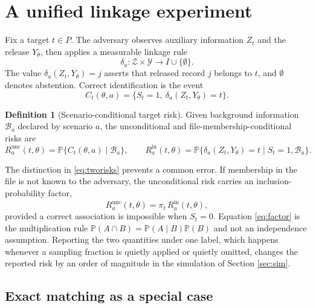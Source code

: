 \documentclass[11pt,a4paper]{article}
\theoremstyle{plain}
\theoremstyle{definition}
\newtheorem{definition}{Definition}
\theoremstyle{definition}
\theoremstyle{plain}
\newcommand{\Prob}{\mathbb{P}}
\begin{document}
\section{A unified linkage experiment}\label{sec:experiment}

Fix a target $t \in P$. The adversary observes auxiliary information $Z_t$ and
the release $Y_\theta$, then applies a measurable linkage rule
\begin{equation}
\delta_a : \mathcal{Z} \times \mathcal{Y} \longrightarrow I \cup \{\emptyset\} .
\label{eq:rule}
\end{equation}
The value $\delta_a(Z_t, Y_\theta) = j$ asserts that released record $j$
belongs to $t$, and $\emptyset$ denotes abstention. Correct identification is
the event
\begin{equation}
C_t(\theta, a) = \{S_t = 1, \ \delta_a(Z_t, Y_\theta) = t\} .
\end{equation}

\begin{definition}[Scenario-conditional target risk]\label{def:risk}
Given background information $\mathcal{B}_a$ declared by scenario $a$, the unconditional
and file-membership-conditional risks are
\begin{equation}
R_a^{\mathrm{unc}}(t, \theta) = \Prob\{C_t(\theta, a) \mid \mathcal{B}_a\}, \qquad
R_a^{\mathrm{in}}(t, \theta) = \Prob\{\delta_a(Z_t, Y_\theta) = t \mid S_t = 1,
\mathcal{B}_a\} .
\label{eq:tworisks}
\end{equation}
\end{definition}

The distinction in \eqref{eq:tworisks} prevents a common error. If membership
in the file is not known to the adversary, the unconditional risk carries an
inclusion-probability factor,
\begin{equation}
R_a^{\mathrm{unc}}(t, \theta) = \pi_t \, R_a^{\mathrm{in}}(t, \theta) ,
\label{eq:factor}
\end{equation}
provided a correct association is impossible when $S_t = 0$. Equation
\eqref{eq:factor} is the multiplication rule $\Prob(A \cap B) = \Prob(A \mid
B)\Prob(B)$ and not an independence assumption. Reporting the two quantities
under one label, which happens whenever a sampling fraction is quietly applied
or quietly omitted, changes the reported risk by an order of magnitude in the
simulation of Section \ref{sec:sim}.

\subsection{Exact matching as a special case}
\end{document}
